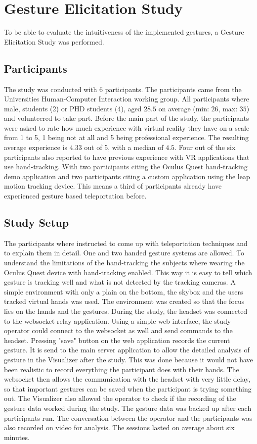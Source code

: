 
\chapter{Gesture Elicitation Study}
To be able to evaluate the intuitiveness of the implemented gestures, a Gesture Elicitation Study was performed. %


\section{Participants}
The study was conducted with 6 participants. The participants came from the Universities Human-Computer Interaction working group. All participants where male, students (2) or PHD students (4), aged $28.5$ on average (min: $26$, max: $35$) and volunteered to take part. Before the main part of the study, the participants were asked to rate how much experience with virtual reality they have on a scale from 1 to 5, 1 being not at all and 5 being professional experience. The resulting average experience is $4.33$ out of 5, with a median of $4.5$. Four out of the six participants also reported to have previous experience with VR applications that use hand-tracking. With two participants citing the Oculus Quest hand-tracking demo application and two participants citing a custom application using the leap motion tracking device. %
This means a third of participants already have experienced gesture based teleportation before. 


\section{Study Setup}
The participants where instructed to come up with teleportation techniques and to explain them in detail. One and two handed gesture systems are allowed. To understand the limitations of the hand-tracking the subjects where wearing the Oculus Quest device with hand-tracking enabled. This way it is easy to tell which gesture is tracking well and what is not detected by the tracking cameras. A simple environment with only a plain on the bottom, the skybox and the users tracked virtual hands was used. The environment was created so that the focus lies on the hands and the gestures. During the study, the headset was connected to the websocket relay application. Using a simple web interface, the study operator could connect to the websocket as well and send commands to the headset. Pressing "save" button on the web application records the current gesture. It is send to the main server application to allow the detailed analysis of gesture in the Visualizer after the study. This was done because it would not have been realistic to record everything the participant does with their hands. The websocket then allows the communication with the headset with very little delay, so that important gestures can be saved when the participant is trying something out. The Visualizer also allowed the operator to check if the recording of the gesture data worked during the study. The gesture data was backed up after each participants run. The conversation between the operator and the participants was also recorded on video for analysis. The sessions lasted on average about six minutes.


